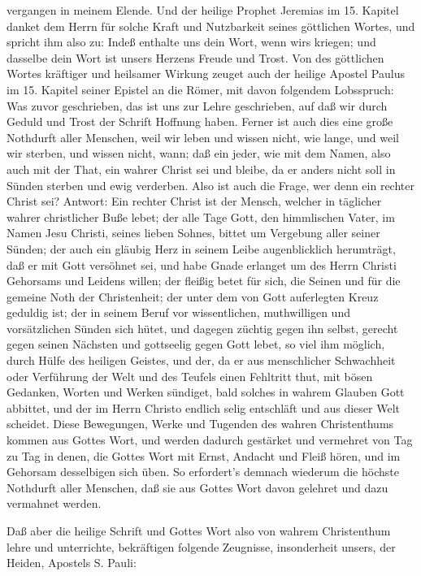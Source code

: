 vergangen in meinem Elende. Und der heilige Prophet Jeremias im 15. Kapitel danket dem Herrn für solche Kraft und Nutzbarkeit seines göttlichen Wortes, und spricht ihm also zu: Indeß enthalte uns dein Wort, wenn wirs kriegen; und dasselbe dein Wort ist unsers Herzens Freude und Trost. Von des göttlichen Wortes kräftiger und heilsamer Wirkung zeuget auch der heilige Apostel Paulus im 15. Kapitel seiner Epistel an die Römer, mit davon folgendem Lobsspruch: Was zuvor geschrieben, das ist uns zur Lehre geschrieben, auf daß wir durch Geduld und Trost der Schrift Hoffnung haben. Ferner ist auch dies eine große Nothdurft aller Menschen, weil wir leben und wissen nicht, wie lange, und weil wir sterben, und wissen nicht, wann; daß ein jeder, wie mit dem Namen, also auch mit der That, ein wahrer Christ sei und bleibe, da er anders nicht soll in Sünden sterben und ewig verderben. Also ist auch die Frage, wer denn ein rechter Christ sei? Antwort: Ein rechter Christ ist der Mensch, welcher in täglicher wahrer christlicher Buße lebet; der alle Tage Gott, den himmlischen Vater, im Namen Jesu Christi, seines lieben Sohnes, bittet um Vergebung aller seiner Sünden; der auch ein gläubig Herz in seinem Leibe augenblicklich herumträgt, daß er mit Gott versöhnet sei, und habe Gnade erlanget um des Herrn Christi Gehorsams und Leidens willen; der fleißig betet für sich, die Seinen und für die gemeine Noth der Christenheit; der unter dem von Gott auferlegten Kreuz geduldig ist; der in seinem Beruf vor wissentlichen, muthwilligen und vorsätzlichen Sünden sich hütet, und dagegen züchtig gegen ihn selbst, gerecht gegen seinen Nächsten und gottseelig gegen Gott lebet, so viel ihm möglich, durch Hülfe des heiligen Geistes, und der, da er aus menschlicher Schwachheit oder Verführung der Welt und des Teufels einen Fehltritt thut, mit bösen Gedanken, Worten und Werken sündiget, bald solches in wahrem Glauben Gott abbittet, und der im Herrn Christo endlich selig entschläft und aus dieser Welt scheidet. Diese Bewegungen, Werke und Tugenden des wahren Christenthums kommen aus Gottes Wort, und werden dadurch gestärket und vermehret von Tag zu Tag in denen, die Gottes Wort mit Ernst, Andacht und Fleiß hören, und im Gehorsam desselbigen sich üben. So erfordert's demnach wiederum die höchste Nothdurft aller Menschen, daß sie aus Gottes Wort davon gelehret und dazu vermahnet werden.


Daß aber die heilige Schrift und Gottes Wort also von wahrem Christenthum lehre und unterrichte, bekräftigen folgende Zeugnisse, insonderheit unsers, der Heiden, Apostels S. Pauli:

